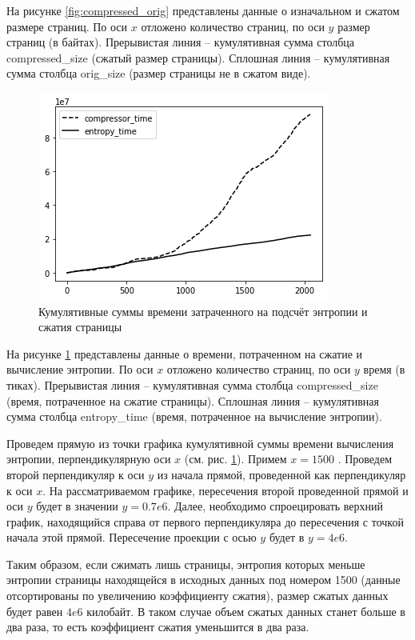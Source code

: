 На рисунке \ref{fig:compressed_orig} представлены данные о изначальном и сжатом размере страниц. По оси $x$ отложено количество страниц, по оси $y$ размер страниц (в байтах). Прерывистая линия -- кумулятивная сумма столбца compressed\_size (сжатый размер страницы). Сплошная линия -- кумулятивная сумма столбца orig\_size (размер страницы не в сжатом виде).

\begin{figure}[h]
	\centering
	\includegraphics[scale=0.9]{img/compressor_entropy_time.png}
	\caption{Кумулятивные суммы времени затраченного на подсчёт энтропии и сжатия страницы}
	\label{fig:compressor_entropy_time}
\end{figure}

На рисунке \ref{fig:compressor_entropy_time} представлены данные о времени, потраченном на сжатие и вычисление энтропии. По оси $x$ отложено количество страниц, по оси $y$ время (в тиках). Прерывистая линия -- кумулятивная сумма столбца compressed\_size (время, потраченное на сжатие страницы). Сплошная линия -- кумулятивная сумма столбца entropy\_time (время, потраченное на вычисление энтропии).

Проведем прямую из точки графика кумулятивной суммы времени вычисления энтропии, перпендикулярную оси $x$ (см. рис. \ref{fig:compressor_entropy_time}). Примем $x = 1500$ . Проведем второй перпендикуляр к оси $y$ из начала прямой, проведенной как перпендикуляр к оси $x$. На рассматриваемом графике, пересечения второй проведенной прямой и оси $y$ будет в значении $y = 0.7e6$. Далее, необходимо спроецировать верхний график, находящийся справа от первого перпендикуляра до пересечения с точкой начала этой прямой. Пересечение проекции с осью $y$ будет в $y = 4e6$. 

Таким образом, если сжимать лишь страницы, энтропия которых меньше энтропии страницы находящейся в исходных данных под номером 1500 (данные отсортированы по увеличению коэффициенту сжатия), размер сжатых данных будет равен $4e6$ килобайт. В таком случае объем сжатых данных станет больше в два раза, то есть коэффициент сжатия уменьшится в два раза.

